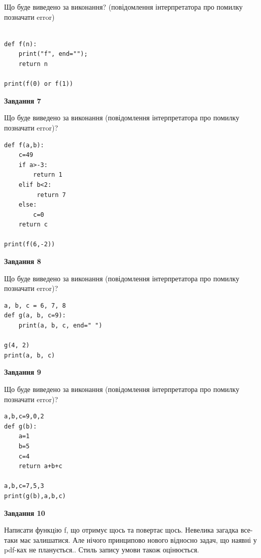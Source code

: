 \documentclass[12pt, ukrainian]{article}
\begin{document}
{\begin {large}
Що буде виведено за виконання? (повідомлення інтерпретатора про помилку позначати error)\par
\begin{verbatim}

def f(n):
    print("f", end="");
    return n

print(f(0) or f(1))
\end{verbatim}

{\begin {center}\textbf{Завдання 7}\end {center}}

Що буде виведено за виконання (повідомлення інтерпретатора про помилку позначати error)?\par
\begin{verbatim}
def f(a,b):
    c=49
    if a>-3:
        return 1
    elif b<2:
         return 7
    else: 
        c=0
    return c

print(f(6,-2))
\end{verbatim}

{\begin {center}\textbf{Завдання 8}\end {center}}

Що буде виведено за виконання (повідомлення інтерпретатора про помилку позначати error)?\par
\begin{verbatim}
a, b, c = 6, 7, 8
def g(a, b, c=9):
    print(a, b, c, end=" ")

g(4, 2)
print(a, b, c)
\end{verbatim}

{\begin {center}\textbf{Завдання 9}\end {center}}

Що буде виведено за виконання (повідомлення інтерпретатора про помилку позначати error)?\par
\begin{verbatim}
a,b,c=9,0,2
def g(b):
    a=1
    b=5
    c=4
    return a+b+c

a,b,c=7,5,3
print(g(b),a,b,c)
\end{verbatim}

{\begin {center}\textbf{Завдання 10}\end {center}}


Написати функцiю f, що отримує щось та повертає щось. Невелика загадка все-таки має залишатися. Але нічого принципово нового відносно задач, що наявні у pdf-ках не планується.. Стиль запису умови також оцінюється.\par
\end {large}}
\newpage
\end{document}
